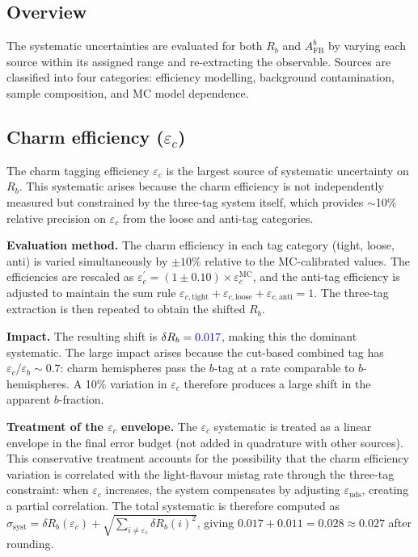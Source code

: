 \documentclass[11pt,a4paper]{article}
\newcommand{\measured}[1]{\textcolor{blue}{#1}}
\begin{document}
\subsection{Overview}

The systematic uncertainties are evaluated for both $R_b$ and
$A_\mathrm{FB}^b$ by varying each source within its assigned range and
re-extracting the observable.  Sources are classified into four
categories: efficiency modelling, background contamination, sample
composition, and MC model dependence.

\subsection{Charm efficiency ($\varepsilon_c$)}
\label{sec:syst-epsc}

The charm tagging efficiency $\varepsilon_c$ is the largest source of
systematic uncertainty on $R_b$.  This systematic arises because the
charm efficiency is not independently measured but constrained by the
three-tag system itself, which provides $\sim$10\% relative precision on
$\varepsilon_c$ from the loose and anti-tag categories.

\textbf{Evaluation method.}
The charm efficiency in each tag category (tight, loose, anti) is varied
simultaneously by $\pm 10\%$ relative to the MC-calibrated values.  The
efficiencies are rescaled as $\varepsilon_c^{\prime} = (1 \pm 0.10) \times
\varepsilon_c^\mathrm{MC}$, and the anti-tag efficiency is adjusted to
maintain the sum rule $\varepsilon_{c,\mathrm{tight}} +
\varepsilon_{c,\mathrm{loose}} + \varepsilon_{c,\mathrm{anti}} = 1$.
The three-tag extraction is then repeated to obtain the shifted $R_b$.

\textbf{Impact.}
The resulting shift is $\delta R_b = \measured{0.017}$, making this the
dominant systematic.  The large impact arises because the cut-based
combined tag has $\varepsilon_c / \varepsilon_b \sim 0.7$: charm
hemispheres pass the $b$-tag at a rate comparable to $b$-hemispheres.
A 10\% variation in $\varepsilon_c$ therefore produces a large shift
in the apparent $b$-fraction.

\textbf{Treatment of the $\varepsilon_c$ envelope.}
The $\varepsilon_c$ systematic is treated as a linear envelope in the
final error budget (not added in quadrature with other sources).  This
conservative treatment accounts for the possibility that the charm
efficiency variation is correlated with the light-flavour mistag rate
through the three-tag constraint: when $\varepsilon_c$ increases, the
system compensates by adjusting $\varepsilon_\mathrm{uds}$, creating a
partial correlation.  The total systematic is therefore computed as
$\sigma_\mathrm{syst} = \delta R_b(\varepsilon_c) + \sqrt{\sum_{i \neq
\varepsilon_c} \delta R_b(i)^2}$, giving
$0.017 + 0.011 = 0.028 \approx 0.027$ after rounding.
\end{document}
